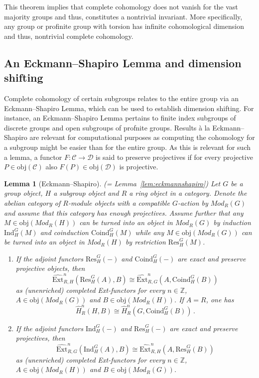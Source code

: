 \documentclass[12pt, a4paper]{article}
\numberwithin{equation}{section}
\newtheorem{lem}[thm]{Lemma}
\theoremstyle{empty}
\theoremstyle{nonumberplain}
\begin{document}
This theorem implies that complete cohomology does not vanish for the vast majority groups and thus, constitutes a  nontrivial invariant. More specifically, any group or profinite group with torsion has infinite cohomological dimension and thus, nontrivial complete cohomology.

\subsection{An Eckmann--Shapiro Lemma and dimension shifting}\label{subsec:shapiroshifting}

Complete cohomology of certain subgroups relates to the entire group via an Eckmann--Shapiro Lemma, which can be used to establish dimension shifting. For instance, an Eckmann--Shapiro Lemma pertains to finite index subgroups of discrete groups and open subgroups of profnite groups. Results à la Eckmann--Shapiro are relevant for computational purposes as computing the cohomology for a subgroup might be easier than for the entire group. As this is relevant for such a lemma, a functor $F: \mathcal{C} \rightarrow \mathcal{D}$ is said to preserve projectives if for every projective $P \in \mathrm{obj}(\mathcal{C})$ also $F(P) \in \mathrm{obj}(\mathcal{D})$ is projective.

\begin{lem}[Eckmann--Shapiro]\label{lem:shapiro}
(= Lemma~\ref{lem:eckmannshapiro}) Let $G$ be a group object, $H$ a subgroup object and $R$ a ring object in a category. Denote the abelian category of $R$-module objects with a compatible $G$-action by $Mod_R(G)$ and assume that this category has enough projectives. Assume further that any $M \in \mathrm{obj}(Mod_R(H))$ can be turned into an object in $Mod_R(G)$ by induction $\mathrm{Ind}_H^G(M)$ and coinduction $\mathrm{Coind}_H^G(M)$ while any $M \in \mathrm{obj}(Mod_R(G))$ can be turned into an object in $Mod_R(H)$ by restriction $\mathrm{Res}_H^G(M)$.
\begin{enumerate}
\item If the adjoint functors $\mathrm{Res}_H^G(-)$ and $\mathrm{Coind}_H^G(-)$ are exact and preserve projective objects, then
\[ \widehat{\mathrm{Ext}}_{R, H}^n(\mathrm{Res}_H^G(A), B) \cong \widehat{\mathrm{Ext}}_{R, G}^n(A, \mathrm{Coind}_H^G(B)) \]
as (unenriched) completed Ext-functors for every $n \in \mathbb{Z}$, $A \in \mathrm{obj}(Mod_R(G))$ and $B \in \mathrm{obj}(Mod_R(H))$. If $A = R$, one has
\[ \widehat{H}_R^n(H, B) \cong \widehat{H}_R^n(G, \mathrm{Coind}_H^G(B)) \, . \]
\item If the adjoint functors $\mathrm{Ind}_H^G(-)$ and $\mathrm{Res}_H^G(-)$ are exact and preserve projectives, then
\[ \widehat{\mathrm{Ext}}_{R, G}^n(\mathrm{Ind}_H^G(A), B) \cong \widehat{\mathrm{Ext}}_{R, H}^n(A, \mathrm{Res}_H^G(B)) \]
as (unenriched) completed Ext-functors for every $n \in \mathbb{Z}$, $A \in \mathrm{obj}(Mod_R(H))$ and $B \in \mathrm{obj}(Mod_R(G))$.
\end{enumerate}
\end{lem}
\end{document}
